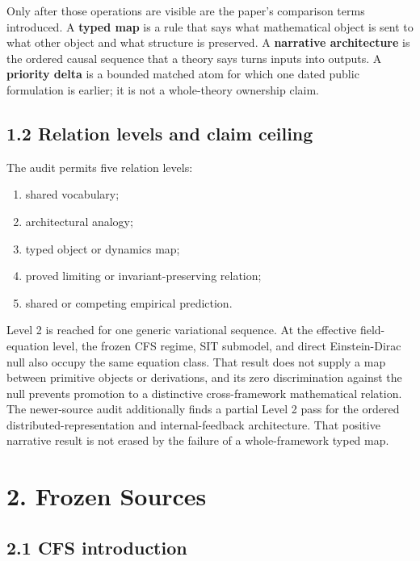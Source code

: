 \documentclass[
  american,
  11pt,
  letterpaper,
]{article}
\providecommand{\tightlist}{%
  \setlength{\itemsep}{0pt}\setlength{\parskip}{0pt}}
\begin{document}
Only after those operations are visible are the paper's comparison terms introduced. A \textbf{typed map} is a rule that says what mathematical object is sent to what other object and what structure is preserved. A \textbf{narrative architecture} is the ordered causal sequence that a theory says turns inputs into outputs. A \textbf{priority delta} is a bounded matched atom for which one dated public formulation is earlier; it is not a whole-theory ownership claim.

\subsection{1.2 Relation levels and claim ceiling}\label{relation-levels-and-claim-ceiling}

The audit permits five relation levels:

\begin{enumerate}
\def\labelenumi{\arabic{enumi}.}
\tightlist
\item
  shared vocabulary;
\item
  architectural analogy;
\item
  typed object or dynamics map;
\item
  proved limiting or invariant-preserving relation;
\item
  shared or competing empirical prediction.
\end{enumerate}

Level 2 is reached for one generic variational sequence. At the effective field-equation level, the frozen CFS regime, SIT submodel, and direct Einstein-Dirac null also occupy the same equation class. That result does not supply a map between primitive objects or derivations, and its zero discrimination against the null prevents promotion to a distinctive cross-framework mathematical relation. The newer-source audit additionally finds a partial Level 2 pass for the ordered distributed-representation and internal-feedback architecture. That positive narrative result is not erased by the failure of a whole-framework typed map.

\section{2. Frozen Sources}\label{frozen-sources}

\subsection{2.1 CFS introduction}\label{cfs-introduction}
\end{document}

